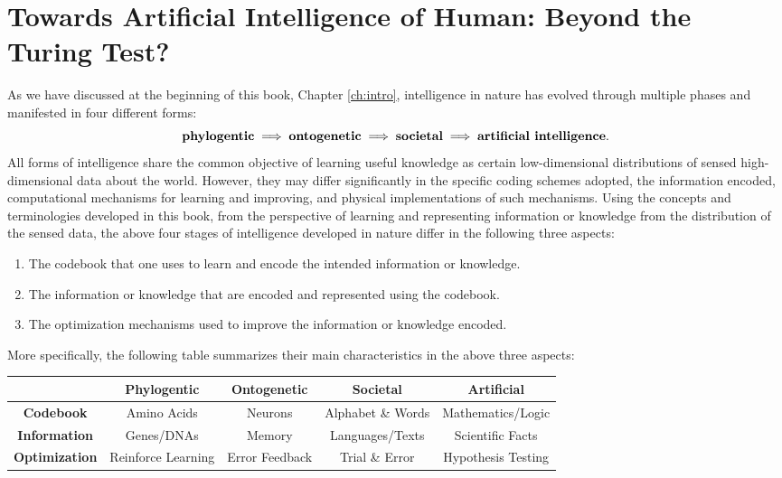 \documentclass[../../book-main.tex]{subfiles}
\begin{document}
\section{Towards Artificial Intelligence of Human: Beyond the Turing Test?}
As we have discussed at the beginning of this book, Chapter \ref{ch:intro}, intelligence in nature has evolved through multiple phases and manifested in four different forms:
\begin{equation}
\mbox{\textbf{phylogentic}} \;
   \Longrightarrow \; \mbox{\textbf{ontogenetic}} \; \Longrightarrow \; 
   \mbox{\textbf{societal}}
   \; \Longrightarrow \; 
   \mbox{\textbf{artificial intelligence}}.
\end{equation}
All forms of intelligence share the common objective of learning useful knowledge as certain low-dimensional distributions of sensed high-dimensional data about the world. However, they may differ significantly in the specific coding schemes adopted, the information encoded, computational mechanisms for learning and improving, and physical implementations of such mechanisms. Using the concepts and terminologies developed in this book, from the perspective of learning and representing information or knowledge from the distribution of the sensed data, the above four stages of intelligence developed in nature differ in the following three aspects:
\begin{enumerate}
    \item The codebook that one uses to learn and encode the intended information or knowledge.
    \item The information or knowledge that are encoded and represented using the codebook. 
    \item The optimization mechanisms used to improve the information or knowledge encoded.
\end{enumerate}
More specifically, the following table summarizes their main characteristics in the above three aspects:
\begin{center}
\begin{tabular}{| c | c | c | c | c |}
\hline & \textbf{Phylogentic} & \textbf{Ontogenetic} & \textbf{Societal} & \textbf{Artificial}\\
\hline
\textbf{Codebook}  & Amino Acids & Neurons & Alphabet \& Words & Mathematics/Logic \\ [0.5ex]
  \hline 
\textbf{Information} & Genes/DNAs & Memory & Languages/Texts & Scientific Facts\\ [0.5ex]
  \hline
\textbf{Optimization} & Reinforce Learning & Error Feedback & Trial \& Error & Hypothesis Testing \\  [0.5ex]
\hline
\end{tabular}
\end{center}
\end{document}
